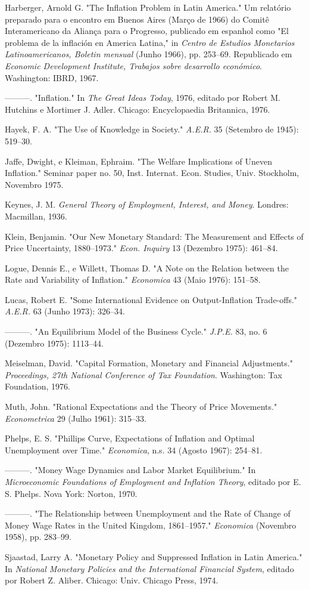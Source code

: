 \documentclass[12pt]{article}
\begin{document}
Harberger, Arnold G. "The Inflation Problem in Latin America." Um relatório preparado para o encontro em Buenos Aires (Março de 1966) do Comitê Interamericano da Aliança para o Progresso, publicado em espanhol como "El problema de la inflación en America Latina," in \textit{Centro de Estudios Monetarios Latinoamericanos, Boletin mensual} (Junho 1966), pp. 253–69. Republicado em \textit{Economic Development Institute, Trabajos sobre desarrollo económico}. Washington: IBRD, 1967.

———. "Inflation." In \textit{The Great Ideas Today}, 1976, editado por Robert M. Hutchins e Mortimer J. Adler. Chicago: Encyclopaedia Britannica, 1976.

Hayek, F. A. "The Use of Knowledge in Society." \textit{A.E.R.} 35 (Setembro de 1945): 519–30.

Jaffe, Dwight, e Kleiman, Ephraim. "The Welfare Implications of Uneven Inflation." Seminar paper no. 50, Inst. Internat. Econ. Studies, Univ. Stockholm, Novembro 1975.

Keynes, J. M. \textit{General Theory of Employment, Interest, and Money}. Londres: Macmillan, 1936.

Klein, Benjamin. "Our New Monetary Standard: The Measurement and Effects of Price Uncertainty, 1880–1973." \textit{Econ. Inquiry} 13 (Dezembro 1975): 461–84.

Logue, Dennis E., e Willett, Thomas D. "A Note on the Relation between the Rate and Variability of Inflation." \textit{Economica} 43 (Maio 1976): 151–58.

Lucas, Robert E. "Some International Evidence on Output-Inflation Trade-offs." \textit{A.E.R.} 63 (Junho 1973): 326–34.

———. "An Equilibrium Model of the Business Cycle." \textit{J.P.E.} 83, no. 6 (Dezembro 1975): 1113–44.

Meiselman, David. "Capital Formation, Monetary and Financial Adjustments." \textit{Proceedings, 27th National Conference of Tax Foundation}. Washington: Tax Foundation, 1976.

Muth, John. "Rational Expectations and the Theory of Price Movements." \textit{Econometrica} 29 (Julho 1961): 315–33.

Phelps, E. S. "Phillips Curve, Expectations of Inflation and Optimal Unemployment over Time." \textit{Economica}, n.s. 34 (Agosto 1967): 254–81.

———. "Money Wage Dynamics and Labor Market Equilibrium." In \textit{Microeconomic Foundations of Employment and Inflation Theory}, editado por E. S. Phelps. Nova York: Norton, 1970.

———. "The Relationship between Unemployment and the Rate of Change of Money Wage Rates in the United Kingdom, 1861–1957." \textit{Economica} (Novembro 1958), pp. 283–99.

Sjaastad, Larry A. "Monetary Policy and Suppressed Inflation in Latin America." In \textit{National Monetary Policies and the International Financial System}, editado por Robert Z. Aliber. Chicago: Univ. Chicago Press, 1974.
\end{document}
